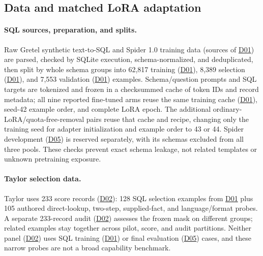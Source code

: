 \documentclass[10pt,letterpaper]{article}
\DeclareRobustCommand{\dataset}[1]{\hyperlink{dataset-#1}{\textnormal{#1}}}
\begin{document}
\subsection{Data and matched LoRA adaptation}
\label{sec:training}

\paragraph{SQL sources, preparation, and splits.}
Raw Gretel synthetic text-to-SQL \citep{gretel2024sql} and Spider 1.0
training data \citep{yu2018spider} (sources of \dataset{D01}) are parsed, checked by SQLite execution,
schema-normalized, and deduplicated, then split by whole schema groups into
62,817 training (\dataset{D01}), 8,389 selection (\dataset{D01}),
and 7,553 validation (\dataset{D01}) examples.
Schema/question prompts and SQL targets are tokenized and frozen in a
checksummed cache of token IDs and record metadata; all nine reported fine-tuned arms 
reuse the same training cache (\dataset{D01}), seed-42 example order, and complete LoRA epoch.
The additional ordinary-LoRA/quota-free-removal pairs reuse that cache and
recipe, changing only the training seed for adapter initialization and
example order to 43 or 44.
Spider development (\dataset{D05}) is reserved separately, with its schemas excluded from all three pools.
These checks prevent exact schema leakage, not related templates or
unknown pretraining exposure.

\paragraph{Taylor selection data.}
Taylor uses 233 score records (\dataset{D02}): 128 SQL selection examples
from \dataset{D01} plus 105
authored direct-lookup, two-step, supplied-fact, and language/format probes.
A separate 233-record audit (\dataset{D02}) assesses the frozen mask on different groups;
related examples stay together across pilot, score, and audit partitions.
Neither panel (\dataset{D02}) uses SQL training
(\dataset{D01}) or final evaluation (\dataset{D05}) cases, and these
narrow probes are not a broad capability benchmark.
\end{document}
